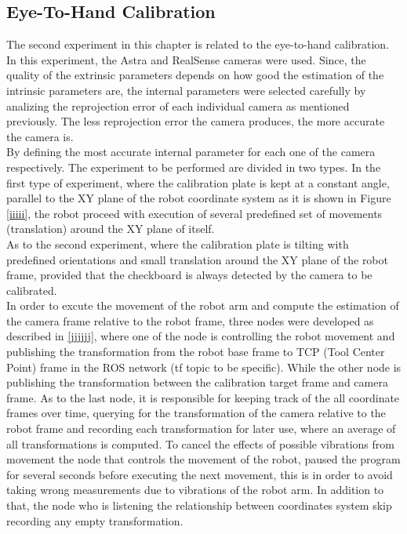 \subsection{Eye-To-Hand Calibration}
The second experiment in this chapter is related to the eye-to-hand calibration. In this experiment, the Astra and RealSense cameras were used. Since, the quality of the extrinsic parameters depends on how good the estimation of the intrinsic parameters are, the internal parameters were selected carefully by analizing the reprojection error of each individual camera as mentioned previously. The less reprojection error the camera produces, the more accurate the camera is. \\
By defining the most accurate internal parameter for each one of the camera respectively. The experiment to be performed are divided in two types.
In the first type of experiment, where the calibration plate is kept at a constant angle, parallel to the XY plane of the robot coordinate system as it is shown in Figure \ref{iiiii}, the robot proceed with execution of several predefined set of movements (translation) around the XY plane of itself.\\ 
As to the second experiment, where the calibration plate is   tilting with predefined orientations and small translation around the XY plane of the robot frame, provided that the checkboard is always detected by the camera to be calibrated.\\

In order to excute the movement of the robot arm and compute the estimation of the camera frame relative to the robot frame, three nodes were developed as described in \ref{jjjjjj}, where one of the node is controlling the robot movement and publishing the transformation from the robot base frame to TCP (Tool Center Point) frame in the ROS network (tf topic to be specific). While the other node is publishing the transformation between the calibration target frame and camera frame. As to the last node, it is responsible for keeping track of the all coordinate frames over time, querying for the transformation of the camera relative to the robot frame and recording each transformation for later use, where an average of all transformations is computed. To cancel the effects of possible vibrations from movement the node that controls the movement of the robot, paused the program for several seconds before executing the next movement, this is in order to avoid taking wrong measurements due to vibrations of the robot arm. In addition to that, the node who is listening the relationship between coordinates system skip recording any empty transformation. 


